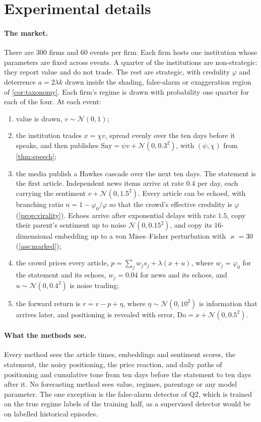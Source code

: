 \documentclass{article}
\theoremstyle{plain}
\theoremstyle{definition}
\theoremstyle{remark}
\newcommand{\N}{\mathcal{N}}
\begin{document}
\section{Experimental details}\label{app:experiments}
\paragraph{The market.} There are $300$ firms and $60$ events per firm. Each firm hosts one institution whose parameters are fixed across events. A quarter of the institutions are non-strategic: they report value and do not trade. The rest are strategic, with credulity $\varphi$ and deterrence $a=2\lambda k$ drawn inside the shading, false-alarm or exaggeration region of \cref{cor:taxonomy}. Each firm's regime is drawn with probability one quarter for each of the four. At each event:
\begin{enumerate}[label=(\arabic*)]
  \item value is drawn, $v\sim\N(0,1)$;
  \item the institution trades $x=\chi v$, spread evenly over the ten days before it speaks, and then publishes $\text{Say}=\psi v+\N(0,0.3^2)$, with $(\psi,\chi)$ from \cref{thm:speech};
  \item the media publish a Hawkes cascade over the next ten days. The statement is the first article. Independent news items arrive at rate $0.4$ per day, each carrying the sentiment $v+\N(0,1.5^2)$. Every article can be echoed, with branching ratio $n=1-\varphi_0/\varphi$ so that the crowd's effective credulity is $\varphi$ (\cref{prop:virality}). Echoes arrive after exponential delays with rate $1.5$, copy their parent's sentiment up to noise $\N(0,0.15^2)$, and copy its $16$-dimensional embedding up to a von Mises--Fisher perturbation with $\varkappa=30$ (\cref{ass:marked});
  \item the crowd prices every article, $p=\sum_j w_j s_j+\lambda(x+u)$, where $w_j=\varphi_0$ for the statement and its echoes, $w_j=0.04$ for news and its echoes, and $u\sim\N(0,0.4^2)$ is noise trading;
  \item the forward return is $r=v-p+\eta$, where $\eta\sim\N(0,10^2)$ is information that arrives later, and positioning is revealed with error, $\text{Do}=x+\N(0,0.5^2)$.
\end{enumerate}

\paragraph{What the methods see.} Every method sees the article times, embeddings and sentiment scores, the statement, the noisy positioning, the price reaction, and daily paths of positioning and cumulative tone from ten days before the statement to ten days after it. No forecasting method sees value, regimes, parentage or any model parameter. The one exception is the false-alarm detector of Q2, which is trained on the true regime labels of the training half, as a supervised detector would be on labelled historical episodes.
\end{document}
